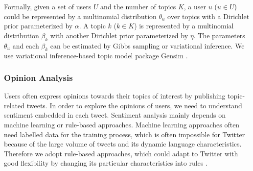 \documentclass[runningheads,a4paper]{llncs}
\begin{document}
Formally, given a set of users $ U $ and the number of topics $ K $, a user $u$ ($ u \in U $) could be represented by a multinomial distribution $ \theta_{u} $ over topics with a Dirichlet prior parameterized by $ \alpha $. 
A topic $ k $ ($ k \in K $) is represented by a multinomial distribution $ \beta_{k} $ with another Dirichlet prior parameterized by $ \eta $. 
The parameters $ \theta_{u} $ and each $ \beta_{k} $ can be estimated by Gibbs sampling or variational inference.
We use variational inference-based topic model package Gensim \cite{rehurek_lrec}.

\subsubsection{Opinion Analysis}
\label{sentiment}

Users often express opinions towards their topics of interest by publishing topic-related tweets. 
In order to explore the opinions of users, we need to understand sentiment embedded in each tweet.
Sentiment analysis mainly depends on machine learning or rule-based approaches. 
Machine learning approaches often need labelled data for the training process, which is often impossible for Twitter because of the large volume of tweets and its dynamic language characteristics. Therefore we adopt rule-based approaches, which could adapt to Twitter with good flexibility by changing its particular characteristics into rules \cite{thelwall2010sentiment}.
\end{document}
